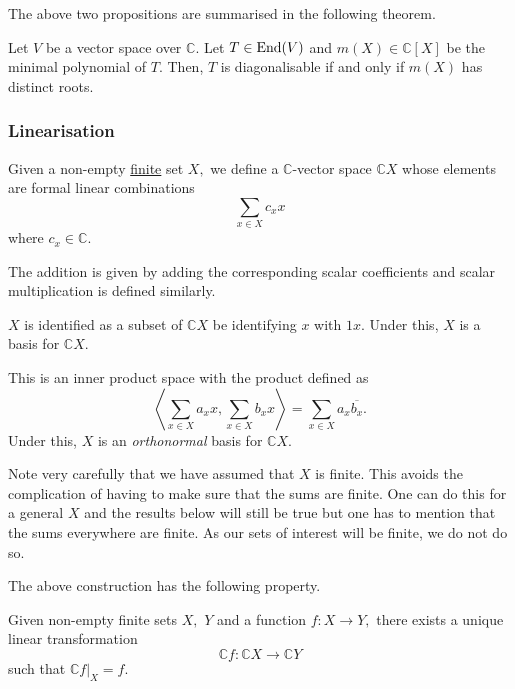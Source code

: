 The above two propositions are summarised in the following theorem.

\begin{thm} \label{thm:splitdistinctdiagonalise}
	Let $V$ be a vector space over $\mathbb{C}.$ Let $T \in \operatorname{End}(V)$ and $m(X) \in \mathbb{C}[X]$ be the minimal polynomial of $T.$ Then, $T$ is diagonalisable if and only if $m(X)$ has distinct roots.	
\end{thm}

\subsubsection{Linearisation} \label{subsec:linearisation}
\begin{defn}[Linearisation] \label{defn:linearisation}
	Given a non-empty \underline{finite} set $X,$ we define a $\mathbb{C}$-vector space $\mathbb{C}X$ whose elements are formal linear combinations
	\begin{equation*} 
		\sum_{x \in X} c_x x
	\end{equation*}
	where $c_x \in \mathbb{C}.$

	The addition is given by adding the corresponding scalar coefficients and scalar multiplication is defined similarly.

	$X$ is identified as a subset of $\mathbb{C}X$ be identifying $x$ with $1x.$ Under this, $X$ is a basis for $\mathbb{C}X.$

	This is an inner product space with the product defined as
	\begin{equation*} 
		\left\langle \sum_{x \in X} a_xx, \sum_{x \in X} b_xx\right\rangle = \sum_{x \in X} a_x \overline{b_x}.
	\end{equation*}
	Under this, $X$ is an \emph{orthonormal} basis for $\mathbb{C}X.$
\end{defn}

Note very carefully that we have assumed that $X$ is finite. This avoids the complication of having to make sure that the sums are finite. One can do this for a general $X$ and the results below will still be true but one has to mention that the sums everywhere are finite. As our sets of interest will be finite, we do not do so.

The above construction has the following property.
\begin{prop} \label{prop:linearfuncextend}
	Given non-empty finite sets $X,$ $Y$ and a function $f : X \to Y,$ there exists a unique linear transformation 
	\begin{equation*} 
		\mathbb{C}f : \mathbb{C}X \to \mathbb{C}Y
	\end{equation*}
	such that $\mathbb{C}f|_X = f.$
\end{prop}

